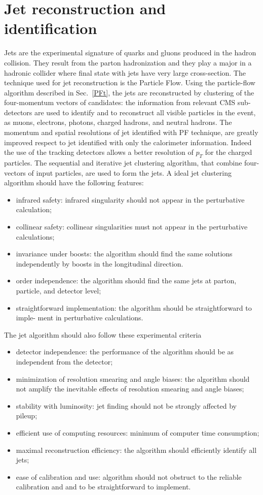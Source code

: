 \section{Jet reconstruction and identification}
\label{jetr}
Jets are the experimental signature of quarks and gluons produced in the hadron collision. They result from the parton  hadronization and they play a major in a hadronic collider where final state with jets have very large cross-section. The technique used for jet reconstruction is the Particle Flow.
Using the particle-flow algorithm described in Sec.~\ref{PFt}, the  jets are reconstructed by clustering of the  four-momentum vectors of candidates: the information from relevant CMS sub-detectors are used to identify and to reconstruct all visible particles in the event, as
 muons, electrons, photons, charged hadrons, and neutral hadrons. 
The momentum and spatial resolutions of jet identified with PF technique, are greatly improved respect to jet identified with only the calorimeter information. Indeed the use of the tracking detectors allows a better resolution of $p_T$ for the charged particles.
The sequential and iterative jet clustering algorithm, that combine four-vectors of input particles, are used to form the jets.
A ideal jet clustering algorithm should have the following features:
\begin{itemize}
\item infrared safety: infrared singularity should not appear in the perturbative calculation;
\item collinear safety: collinear singularities must not appear in the perturbative calculations;
\item invariance under boosts: the algorithm should find the same solutions independently
by boosts in the longitudinal direction.
\item order independence: the algorithm should find the same jets at parton, particle, and detector level;
\item straightforward implementation: the algorithm should be straightforward to imple-
ment in perturbative calculations.
\end{itemize}
The jet algorithm should also follow these  experimental criteria
\begin{itemize}
\item detector independence: the performance of the algorithm should be as independent from the detector;
\item minimization of resolution smearing and angle biases: the algorithm should not
amplify the inevitable effects of resolution smearing and angle biases;
\item stability with luminosity: jet finding should not be strongly affected by pileup;
\item efficient use of computing resources: minimum of computer time consumption;
\item maximal reconstruction efficiency: the algorithm should efficiently identify all jets;
\item ease of calibration and use: algorithm should not obstruct to the reliable calibration and and to be straightforward to implement.
\end{itemize}
